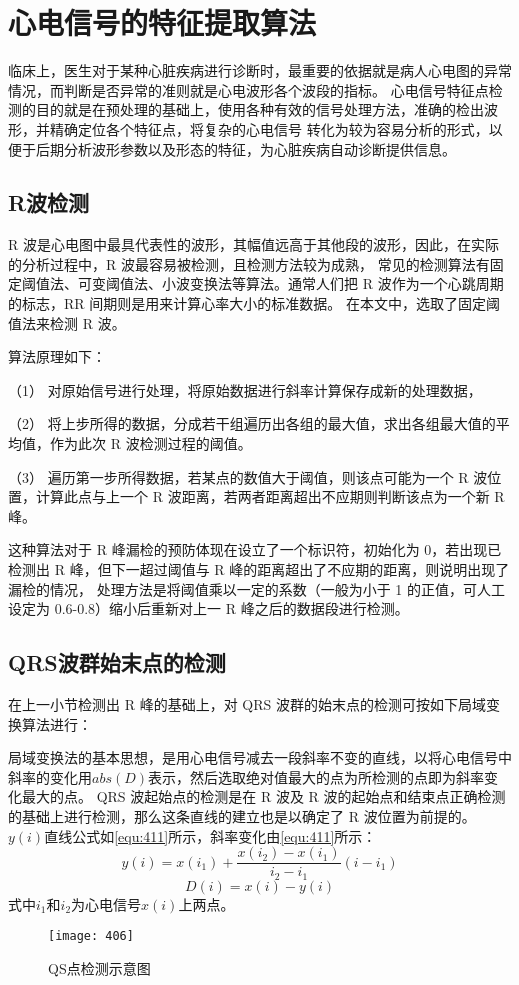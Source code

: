 \section{心电信号的特征提取算法}
临床上，医生对于某种心脏疾病进行诊断时，最重要的依据就是病人心电图的异常情况，而判断是否异常的准则就是心电波形各个波段的指标。
心电信号特征点检测的目的就是在预处理的基础上，使用各种有效的信号处理方法，准确的检出波形，并精确定位各个特征点，将复杂的心电信号
转化为较为容易分析的形式，以便于后期分析波形参数以及形态的特征，为心脏疾病自动诊断提供信息。 

\subsection{R波检测}
R 波是心电图中最具代表性的波形，其幅值远高于其他段的波形，因此，在实际的分析过程中，R 波最容易被检测，且检测方法较为成熟，
常见的检测算法有固定阈值法、可变阈值法、小波变换法等算法。通常人们把 R 波作为一个心跳周期的标志，RR 间期则是用来计算心率大小的标准数据。
在本文中，选取了固定阈值法来检测 R 波。 

算法原理如下： 

（1） 对原始信号进行处理，将原始数据进行斜率计算保存成新的处理数据， 

（2）	将上步所得的数据，分成若干组遍历出各组的最大值，求出各组最大值的平均值，作为此次 R 波检测过程的阈值。

（3）	遍历第一步所得数据，若某点的数值大于阈值，则该点可能为一个 R 波位置，计算此点与上一个 R 波距离，若两者距离超出不应期则判断该点为一个新 R 峰。 

这种算法对于 R 峰漏检的预防体现在设立了一个标识符，初始化为 0，若出现已检测出 R 峰，但下一超过阈值与 R 峰的距离超出了不应期的距离，则说明出现了漏检的情况，
处理方法是将阈值乘以一定的系数（一般为小于 1 的正值，可人工设定为 0.6-0.8）缩小后重新对上一 R 峰之后的数据段进行检测。 

\subsection{QRS波群始末点的检测}
在上一小节检测出 R 峰的基础上，对 QRS 波群的始末点的检测可按如下局域变换算法进行\cite{21,22}： 

局域变换法的基本思想，是用心电信号减去一段斜率不变的直线，以将心电信号中斜率的变化用$abs(D)$表示，然后选取绝对值最大的点为所检测的点即为斜率变化最大的点。
QRS 波起始点的检测是在 R 波及 R 波的起始点和结束点正确检测的基础上进行检测，那么这条直线的建立也是以确定了 R 波位置为前提的。
$y(i)$直线公式如\autoref{equ:411}所示，斜率变化由\autoref{equ:411}所示： 
\begin{equation}
    \label{equ:411}
    y(i)=x(i_1)+\frac{x(i_2)-x(i_1)}{i_2-i_1}(i-i_1)
\end{equation}
\begin{equation}
    \label{equ:412}
    D(i)=x(i)-y(i)
\end{equation}
式中$i_1$和$i_2$为心电信号$x(i)$上两点。 
\begin{figure}[htbp]
    \centering
    \texttt{[image: 406]}
    \caption{\label{fig:406}QS点检测示意图}
\end{figure}

